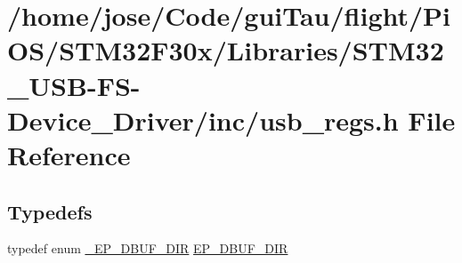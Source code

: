 \hypertarget{_s_t_m32_f30x_2_libraries_2_s_t_m32___u_s_b-_f_s-_device___driver_2inc_2usb__regs_8h}{\section{/home/jose/\-Code/gui\-Tau/flight/\-Pi\-O\-S/\-S\-T\-M32\-F30x/\-Libraries/\-S\-T\-M32\-\_\-\-U\-S\-B-\/\-F\-S-\/\-Device\-\_\-\-Driver/inc/usb\-\_\-regs.h File Reference}
\label{_s_t_m32_f30x_2_libraries_2_s_t_m32___u_s_b-_f_s-_device___driver_2inc_2usb__regs_8h}
}
\subsection*{Typedefs}
\begin{DoxyCompactItemize}
\item 
typedef enum \hyperlink{_s_t_m32_f10x_2_libraries_2_s_t_m32___u_s_b-_f_s-_device___driver_2inc_2usb__regs_8h_a1cc7345c82090e4a88480f96f5d0d802}{\-\_\-\-E\-P\-\_\-\-D\-B\-U\-F\-\_\-\-D\-I\-R} \hyperlink{_s_t_m32_f30x_2_libraries_2_s_t_m32___u_s_b-_f_s-_device___driver_2inc_2usb__regs_8h_abece26f40c007d1794916066fa950085}{E\-P\-\_\-\-D\-B\-U\-F\-\_\-\-D\-I\-R}
\end{DoxyCompactItemize}
